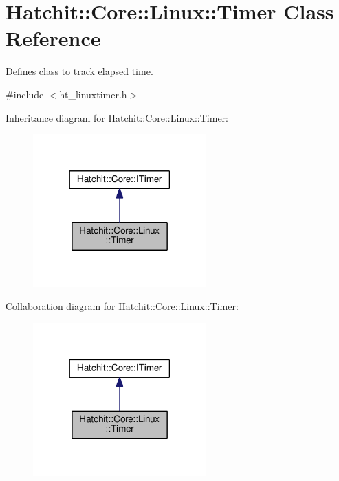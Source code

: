 \hypertarget{classHatchit_1_1Core_1_1Linux_1_1Timer}{}\section{Hatchit\+:\+:Core\+:\+:Linux\+:\+:Timer Class Reference}
\label{classHatchit_1_1Core_1_1Linux_1_1Timer}


Defines class to track elapsed time.  




{\ttfamily \#include $<$ht\+\_\+linuxtimer.\+h$>$}



Inheritance diagram for Hatchit\+:\+:Core\+:\+:Linux\+:\+:Timer\+:
\nopagebreak
\begin{figure}[H]
\begin{center}
\leavevmode
\includegraphics[width=189pt]{classHatchit_1_1Core_1_1Linux_1_1Timer__inherit__graph}
\end{center}
\end{figure}


Collaboration diagram for Hatchit\+:\+:Core\+:\+:Linux\+:\+:Timer\+:
\nopagebreak
\begin{figure}[H]
\begin{center}
\leavevmode
\includegraphics[width=189pt]{classHatchit_1_1Core_1_1Linux_1_1Timer__coll__graph}
\end{center}
\end{figure}
